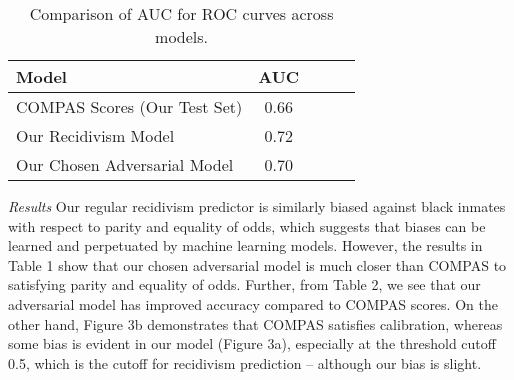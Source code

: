 \documentclass{article}
\begin{document}
\begin{table}[h!]
\vskip 0.15in
\begin{center}
\begin{small}
\begin{sc}
\end{sc}
\end{small}
\end{center}
\vskip -0.1in
\caption{Comparison of High Risk Gap, False Negative Gap (FN Gap), and False Positive Gap (FP Gap), across models.}
\vspace{-3mm}
\end{table}

\begin{table} [h!]
\vskip 0.15in
\begin{center}
\begin{small}
\begin{sc}
\begin{tabular}{lcccr}
\toprule
Model& AUC\\
\midrule
COMPAS Scores (Our Test Set) & 0.66\\
Our Recidivism Model & 0.72\\
Our Chosen Adversarial Model & 0.70\\
\bottomrule
\end{tabular}
\end{sc}
\end{small}
\end{center}
\vskip -0.1in
\caption{Comparison of AUC for ROC curves across models.}
\vspace{-1mm}
\end{table}

\textit{Results} Our regular recidivism predictor is similarly biased against black inmates with respect to parity and equality of odds, which suggests that biases can be learned and perpetuated by machine learning models. However, the results in Table 1 show that our chosen adversarial model is much closer than COMPAS to satisfying parity and equality of odds. Further, from Table 2, we see that our adversarial model has improved accuracy compared to COMPAS scores. On the other hand, Figure 3b demonstrates that COMPAS satisfies calibration, whereas some bias is evident in our model (Figure 3a), especially at the threshold cutoff 0.5, which is the cutoff for recidivism prediction -- although our bias is slight.
\end{document}
